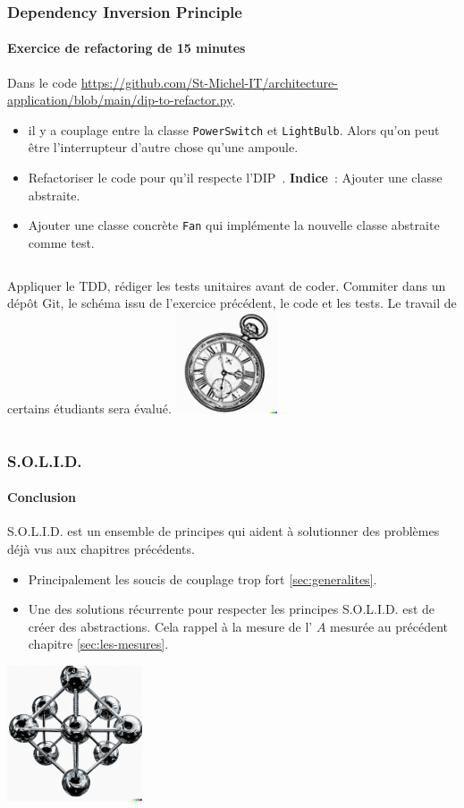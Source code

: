 \documentclass{beamer}
\begin{document}
    \begin{frame}
        \transdissolve
        \frametitle{Dependency Inversion Principle}
        \framesubtitle{Exercice \execcounterdispinc{} de refactoring de 15 minutes}
        Dans le code \url{https://github.com/St-Michel-IT/architecture-application/blob/main/dip-to-refactor.py}.
        \begin{itemize}
            \item il y a couplage entre la classe \lstinline{PowerSwitch} et \lstinline{LightBulb}.
            Alors qu'on peut être l'interrupteur d'autre chose qu'une ampoule.
            \item Refactoriser le code pour qu'il respecte l'DIP~. \textbf{Indice}~: Ajouter une classe abstraite.
            \item Ajouter une classe concrète \lstinline{Fan} qui implémente la nouvelle classe abstraite comme test.
        \end{itemize}
        \bigbreak
        \begin{columns}
            Appliquer le TDD, rédiger les tests unitaires avant de coder.
            \bigbreak
            Commiter dans un dépôt Git, le schéma issu de l'exercice précédent, le code et les tests.
            \bigbreak
            Le travail de certains étudiants sera évalué.
            \centering
            \includegraphics[width=3cm]{image/engraving-of-an-old-watch}
        \end{columns}
    \end{frame}

    \begin{frame}
        \transdissolve
        \frametitle{S.O.L.I.D.}
        \framesubtitle{Conclusion}
        S.O.L.I.D. est un ensemble de principes qui aident à solutionner des problèmes déjà vus aux chapitres précédents.
        \begin{itemize}
            \item Principalement les soucis de couplage trop fort \cref{sec:generalites}.
            \item Une des solutions récurrente pour respecter les principes S.O.L.I.D. est de créer des abstractions.
            Cela rappel à la mesure de l' $A$ mesurée au précédent chapitre \cref{sec:les-mesures}.
        \end{itemize}
        \bigbreak
        \centering
        \includegraphics[width=4cm]{image/carbon-atoms}
    \end{frame}
\end{document}

